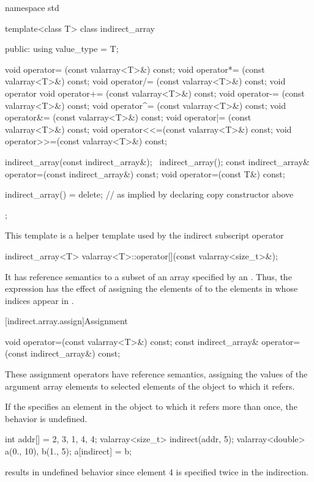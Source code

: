 %
%
\begin{codeblock}
namespace std {
  template<class T> class indirect_array {
  public:
    using value_type = T;

    void operator=  (const valarray<T>&) const;
    void operator*= (const valarray<T>&) const;
    void operator/= (const valarray<T>&) const;
    void operator%
    void operator+= (const valarray<T>&) const;
    void operator-= (const valarray<T>&) const;
    void operator^= (const valarray<T>&) const;
    void operator&= (const valarray<T>&) const;
    void operator|= (const valarray<T>&) const;
    void operator<<=(const valarray<T>&) const;
    void operator>>=(const valarray<T>&) const;

    indirect_array(const indirect_array&);
    ~indirect_array();
    const indirect_array& operator=(const indirect_array&) const;
    void operator=(const T&) const;

    indirect_array() = delete;  // as implied by declaring copy constructor above
  };
}
\end{codeblock}

\pnum
This template is a helper template used by the indirect subscript operator

%
\begin{itemdecl}
indirect_array<T> valarray<T>::operator[](const valarray<size_t>&);
\end{itemdecl}

\pnum
It has reference semantics to a subset of an array specified by an
.
Thus, the expression
has the effect of assigning the elements of
to the elements in
whose indices appear in
.

[indirect.array.assign]{Assignment}

%
\begin{itemdecl}
void operator=(const valarray<T>&) const;
const indirect_array& operator=(const indirect_array&) const;
\end{itemdecl}

\begin{itemdescr}
\pnum
These assignment operators have reference semantics, assigning the values
of the argument array elements to selected elements of the
object to which it refers.

\pnum
If the
specifies an element in the
object to which it refers more than once, the behavior is undefined.
%

\pnum
\begin{example}
\begin{codeblock}
int addr[] = {2, 3, 1, 4, 4};
valarray<size_t> indirect(addr, 5);
valarray<double> a(0., 10), b(1., 5);
a[indirect] = b;
\end{codeblock}
results in undefined behavior since element 4 is specified twice in the
indirection.
\end{example}
\end{itemdescr}

